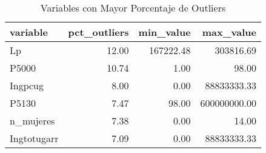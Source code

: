 \begin{table}[ht]
\centering
\begin{tabular}{lrrr}
  \toprule
variable & pct\_outliers & min\_value & max\_value \\ 
  \midrule
Lp & 12.00 & 167222.48 & 303816.69 \\ 
  P5000 & 10.74 & 1.00 & 98.00 \\ 
  Ingpcug & 8.00 & 0.00 & 88833333.33 \\ 
  P5130 & 7.47 & 98.00 & 600000000.00 \\ 
  n\_mujeres & 7.38 & 0.00 & 14.00 \\ 
  Ingtotugarr & 7.09 & 0.00 & 88833333.33 \\ 
   \bottomrule
\end{tabular}
\caption{Variables con Mayor Porcentaje de Outliers} 
\label{tab:variables_outliers}
\end{table}
